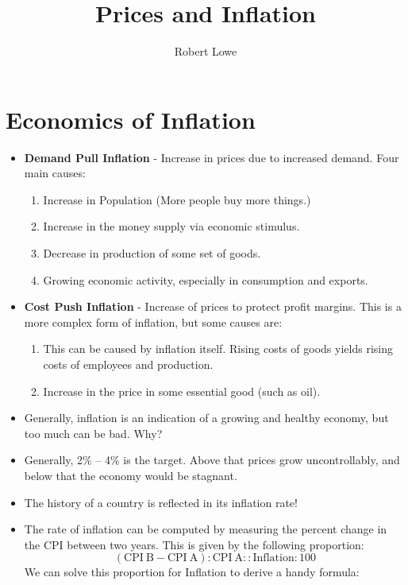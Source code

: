 \documentclass{article}
\title{Prices and Inflation}
\author{Robert Lowe}
\begin{document}
\maketitle
\setlength{\jot}{12pt}

\section*{Economics of Inflation}
\begin{itemize}
\item {\bf Demand Pull Inflation} - Increase in prices due to increased demand. Four main causes:
    \begin{enumerate}
        \item Increase in Population (More people buy more things.)
        \item Increase in the money supply via economic stimulus.
        \item Decrease in production of some set of goods.
        \item Growing economic activity, especially in consumption and exports.
    \end{enumerate}
\item {\bf Cost Push Inflation} - Increase of prices to protect profit margins. This is a more complex form of inflation, but some causes are:
    \begin{enumerate}
        \item This can be caused by inflation itself.  Rising costs of goods yields rising costs of employees and production.
        \item Increase in the price in some essential good (such as oil).
    \end{enumerate}
    \item Generally, inflation is an indication of a growing and healthy economy, but too much can be bad.  Why?
    \item Generally, 2\% -- 4\% is the target.  Above that prices grow uncontrollably, and below that the economy would be stagnant.
    \item The history of a country is reflected in its inflation rate!
    \item The rate of inflation can be computed by measuring the percent change in the CPI between two years.  This is given by the following proportion:
    \[
    \mathrm{(CPI\ B-CPI\ A):CPI\ A :: Inflation : 100}
    \]
    We can solve this proportion for Inflation to derive a handy formula:
    

\end{itemize}
\end{document}
